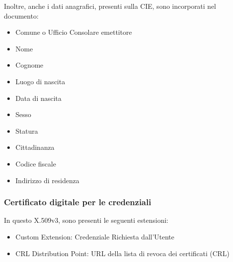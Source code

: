                 \noindent Inoltre, anche i dati anagrafici, presenti sulla CIE, sono incorporati nel documento:

                \begin{multicols}{2}
                    \begin{itemize}
                        \item Comune o Ufficio Consolare emettitore
                        
                        \item Nome
                        
                        \item Cognome
                        
                        \item Luogo di nascita
                        
                        \item Data di nascita
                        
                        \item Sesso
                        
                        \item Statura
                        
                        \item Cittadinanza
                        
                        \item Codice fiscale
                        
                        \item Indirizzo di residenza
                    \end{itemize}
                \end{multicols}

            \subsubsection{Certificato digitale per le credenziali}
                In questo X.509v3, sono presenti le seguenti estensioni:
                
                \begin{itemize}
                    \item Custom Extension: Credenziale Richiesta dall'Utente
                    
                    \item CRL Distribution Point: URL della lista di revoca dei certificati (CRL)
                \end{itemize}
                
